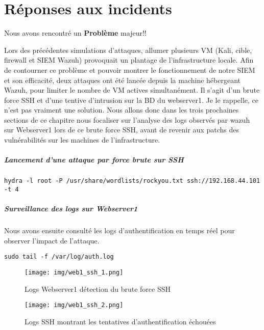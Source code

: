 \documentclass[a4paper,12pt]{report}
\begin{document}
\chapter{Réponses aux incidents}
Nous avons rencontré un \textbf{Problème} majeur!!

Lors des précédentes simulations d’attaques, allumer plusieurs VM (Kali, cible, firewall et SIEM Wazuh) provoquait un plantage de l’infrastructure locale. Afin de contourner ce problème et pouvoir montrer le fonctionnement de notre SIEM et son efficacité, deux attaques ont été lancée depuis la machine hébergeant Wazuh, pour limiter le nombre de VM actives simultanément. Il s'agit d'un brute force SSH et d'une tentive d'intrusion sur la BD du webserver1.  Je le rappelle, ce n'est pas vraiment une solution. Nous allons donc dans les trois prochaines sections de ce chapitre nous focaliser sur l'analyse des logs observés par wazuh sur Webserver1 lors de ce brute force SSH, avant de revenir aux patchs des vulnérabilités sur les machines de l'infrastructure. 

 \paragraph{Lancement d'une attaque par force brute sur SSH} 
 
\begin{lstlisting}
hydra -l root -P /usr/share/wordlists/rockyou.txt ssh://192.168.44.101 -t 4
\end{lstlisting}


\paragraph{Surveillance des logs sur Webserver1}

Nous avons ensuite consulté les logs d'authentification en temps réel pour observer l'impact de l'attaque.

\begin{lstlisting}
sudo tail -f /var/log/auth.log
\end{lstlisting}

\begin{figure}[H]
\centering
\texttt{[image: img/web1\_ssh\_1.png]}
\caption{Logs Webserver1 détection du brute force SSH }
\end{figure}


\begin{figure}[H]
\centering
\texttt{[image: img/web1\_ssh\_2.png]}
\caption{Logs SSH montrant les tentatives d'authentification échouées}
\end{figure}
\end{document}
